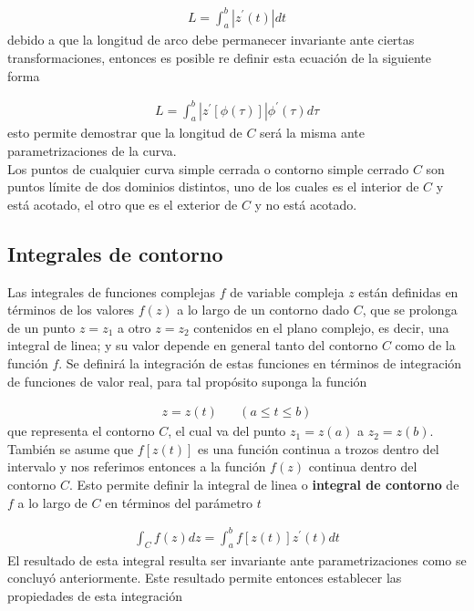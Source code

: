 \begin{gather*}
    L = \int_{a}^{b}|z^{\prime}(t)|dt 
\end{gather*}
debido a que la longitud de arco debe permanecer invariante ante ciertas transformaciones, entonces es posible re definir esta ecuación de la siguiente forma

\begin{gather*}
    L = \int_{a}^{b}|z^{\prime}[\phi(\tau)]|\phi^{\prime}(\tau)d\tau 
\end{gather*}
esto permite demostrar que la longitud de $C$ será la misma ante parametrizaciones de la curva.\newline\\ 
Los puntos de cualquier curva simple cerrada o contorno simple cerrado $C$ son puntos límite de dos dominios distintos, uno de los cuales es el interior de $C$ y está acotado, el otro que es el exterior de $C$ y no está acotado.

\subsection{Integrales de contorno}

Las integrales de funciones complejas $f$ de variable compleja $z$ están definidas en términos de los valores $f(z)$ a lo largo de un contorno dado $C$, que se prolonga de un punto $z = z_1$ a otro $z = z_2$ contenidos en el plano complejo, es decir, una integral de linea; y su valor depende en general tanto del contorno $C$ como de la función $f$. Se definirá la integración de estas funciones en términos de integración de funciones de valor real, para tal propósito suponga la función 

\begin{gather*}
    z = z(t) \;\;\;\;\;\; (a \leq t \leq b)
\end{gather*}
que representa el contorno $C$, el cual va del punto $z_1 = z(a)$ a $z_2 = z(b)$. También se asume que $f[z(t)]$ es una función continua a trozos dentro del intervalo y nos referimos entonces a la función $f(z)$ continua dentro del contorno $C$. Esto permite definir la integral de linea o \textbf{integral de contorno} de $f$ a lo largo de $C$ en términos del parámetro $t$ 

\begin{gather*}
    \int_C f(z)dz = \int_{a}^{b}f[z(t)]z^{\prime}(t)dt
\end{gather*}
El resultado de esta integral resulta ser invariante ante parametrizaciones como se concluyó anteriormente. Este resultado permite entonces establecer las propiedades de esta integración 

